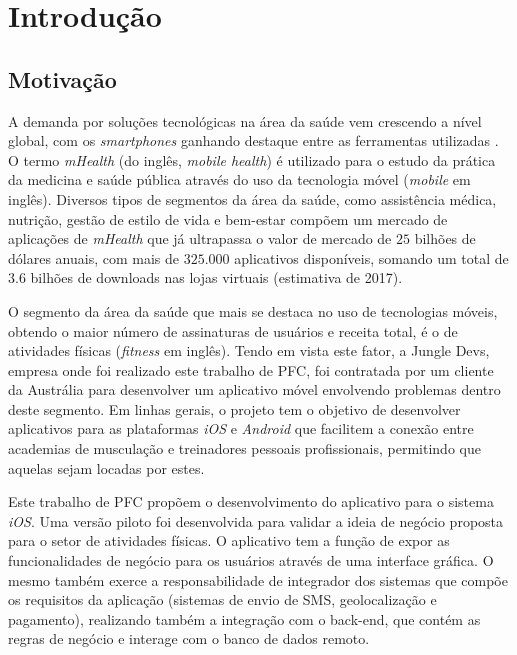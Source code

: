 \chapter{Introdução} \label{cap:intro}
\section{Motivação}
A demanda por soluções tecnológicas na área da saúde vem crescendo a nível global, com os  \textit{smartphones} ganhando destaque entre as ferramentas utilizadas . O termo \textit{mHealth} (do inglês, \textit{mobile health}) é utilizado para o estudo da prática da medicina e saúde pública através do uso da tecnologia móvel (\textit{mobile} em inglês). Diversos tipos de segmentos da área da saúde, como assistência médica, nutrição, gestão de estilo de vida e bem-estar compõem um mercado de aplicações de \textit{mHealth} que já ultrapassa o valor de mercado de $25$ bilhões de dólares anuais, com mais de $325.000$ aplicativos disponíveis, somando um total de $3.6$ bilhões de downloads nas lojas virtuais (estimativa de 2017).

O segmento da área da saúde que mais se destaca no uso de tecnologias móveis, obtendo o maior número de assinaturas de usuários e receita total, é o de atividades físicas (\textit{fitness} em inglês). Tendo em vista este fator, a Jungle Devs, empresa onde foi realizado este trabalho de PFC, foi contratada por um cliente da Austrália para desenvolver um aplicativo móvel envolvendo problemas dentro deste segmento. Em linhas gerais, o projeto tem o objetivo de desenvolver aplicativos para as plataformas \textit{iOS} e \textit{Android} que facilitem a conexão entre academias de musculação e treinadores pessoais profissionais, permitindo que aquelas sejam locadas por estes.

Este trabalho de PFC propõem o desenvolvimento do aplicativo para o sistema \textit{iOS}. Uma versão piloto foi desenvolvida para validar a ideia de negócio proposta para o setor de atividades físicas. O aplicativo tem a função de expor as funcionalidades de negócio para os usuários através de uma interface gráfica. O mesmo também exerce a responsabilidade de integrador dos sistemas que compõe os requisitos da aplicação (sistemas de envio de SMS, geolocalização e pagamento), realizando também a integração com o back-end, que contém as regras de negócio e interage com o banco de dados remoto.

